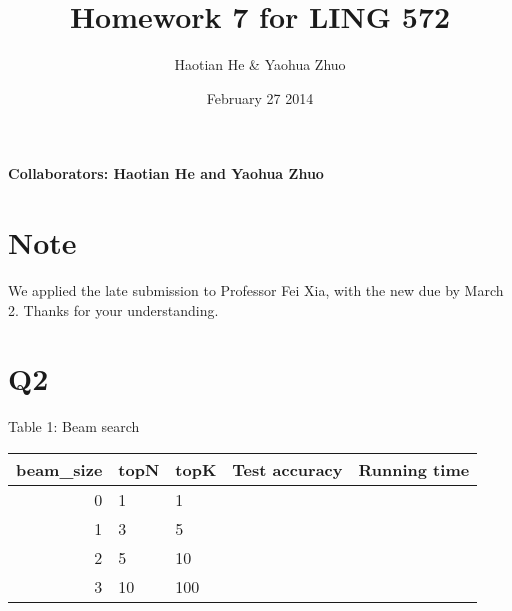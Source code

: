 \documentclass[11pt]{article}
\title{Homework 7 for LING 572}
\author{Haotian He \& Yaohua Zhuo}
\date{February 27 2014}
\begin{document}
\maketitle
\textbf{Collaborators: Haotian He and Yaohua Zhuo}
\section{Note}
We applied the late submission to Professor Fei Xia, with the new due by March 2. Thanks for your understanding.
\section{Q2}
Table 1: Beam search \\
    \begin{tabular}{|r|l|l|l|l|}
    \hline
    beam\_size & topN & topK & Test accuracy & Running time \\ \hline
    0         & 1    & 1    & ~             & ~            \\ \hline
    1         & 3    & 5    & ~             & ~            \\ \hline
    2         & 5    & 10   & ~             & ~            \\ \hline
    3         & 10   & 100  & ~             & ~            \\ \hline
    \end{tabular}
\end{document}
